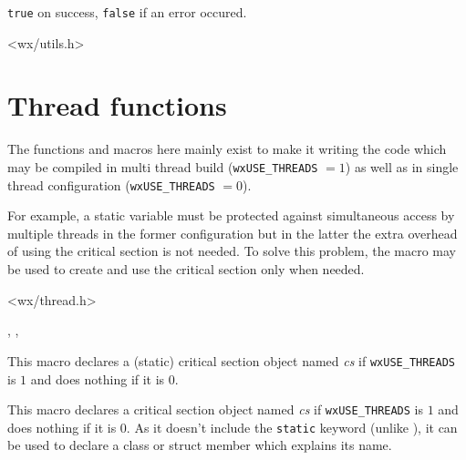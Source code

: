 

{\tt true} on success, {\tt false} if an error occured.


<wx/utils.h>



\section{Thread functions}\label{threadfunctions}

The functions and macros here mainly exist to make it writing the code which
may be compiled in multi thread build ({\tt wxUSE\_THREADS} $= 1$) as well as
in single thread configuration ({\tt wxUSE\_THREADS} $= 0$).

For example, a static variable must be protected against simultaneous access by
multiple threads in the former configuration but in the latter the extra
overhead of using the critical section is not needed. To solve this problem,
the  macro may be used
to create and use the critical section only when needed.


<wx/thread.h>


, , 



\label{wxcritsectdeclare}


This macro declares a (static) critical section object named {\it cs} if 
{\tt wxUSE\_THREADS} is $1$ and does nothing if it is $0$.



\label{wxcritsectdeclaremember}


This macro declares a critical section object named {\it cs} if 
{\tt wxUSE\_THREADS} is $1$ and does nothing if it is $0$. As it doesn't
include the {\tt static} keyword (unlike 
), it can be used to declare
a class or struct member which explains its name.



